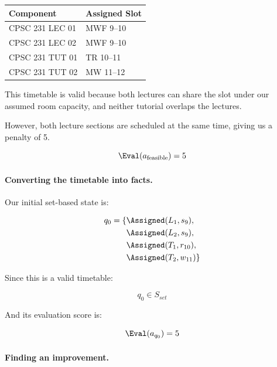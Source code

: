 \begin{center}
\begin{tabular}{ll}
\hline
Component & Assigned Slot\\
\hline
CPSC 231 LEC 01 & MWF 9--10\\
CPSC 231 LEC 02 & MWF 9--10\\
CPSC 231 TUT 01 & TR 10--11\\
CPSC 231 TUT 02 & MW 11--12\\
\hline
\end{tabular}
\end{center}

This timetable is valid because both lectures can share the slot under our assumed room capacity, and neither tutorial overlaps the lectures.

However, both lecture sections are scheduled at the same time, giving us a penalty of 5.

\begin{equation}
    \Eval(a_{\mathrm{feasible}})=5
\end{equation}

\paragraph{Converting the timetable into facts.}

Our initial set-based state is:

\begin{equation}
\begin{aligned}
q_0=\{&
\Assigned(L_1,s_9),\\
&
\Assigned(L_2,s_9),\\
&
\Assigned(T_1,r_{10}),\\
&
\Assigned(T_2,w_{11})
\}
\end{aligned}
\end{equation}

Since this is a valid timetable:

\begin{equation}
    q_0\in S_{set}
\end{equation}

And its evaluation score is:

\begin{equation}
    \Eval(a_{q_0})=5
\end{equation}

\paragraph{Finding an improvement.}

